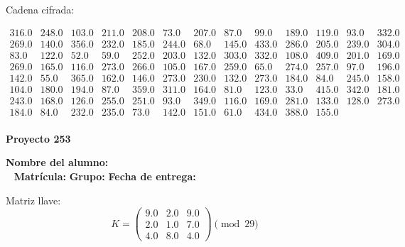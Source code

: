 \documentclass[12pt]{article}
\begin{document}
Cadena cifrada:
\begin{center}
$\begin{array}{lllllllllllll}
316.0 & 248.0 & 103.0 & 211.0 & 208.0 & 73.0 & 207.0 & 87.0 & 99.0 & 189.0 & 119.0 & 93.0 & 332.0\\
269.0 & 140.0 & 356.0 & 232.0 & 185.0 & 244.0 & 68.0 & 145.0 & 433.0 & 286.0 & 205.0 & 239.0 & 304.0\\
83.0 & 122.0 & 52.0 & 59.0 & 252.0 & 203.0 & 132.0 & 303.0 & 332.0 & 108.0 & 409.0 & 201.0 & 169.0\\
269.0 & 165.0 & 116.0 & 273.0 & 266.0 & 105.0 & 167.0 & 259.0 & 65.0 & 274.0 & 257.0 & 97.0 & 196.0\\
142.0 & 55.0 & 365.0 & 162.0 & 146.0 & 273.0 & 230.0 & 132.0 & 273.0 & 184.0 & 84.0 & 245.0 & 158.0\\
104.0 & 180.0 & 194.0 & 87.0 & 359.0 & 311.0 & 164.0 & 81.0 & 123.0 & 33.0 & 415.0 & 342.0 & 181.0\\
243.0 & 168.0 & 126.0 & 255.0 & 251.0 & 93.0 & 349.0 & 116.0 & 169.0 & 281.0 & 133.0 & 128.0 & 273.0\\
184.0 & 84.0 & 232.0 & 235.0 & 73.0 & 142.0 & 151.0 & 61.0 & 434.0 & 388.0 & 155.0\\
\end{array}$
\end{center}

\newpage


\textbf{Proyecto 253}

\textbf{Nombre del alumno:} \underline{\hspace{13cm}}\\\
\vspace{1cm}
\textbf{Matrícula:} \underline{\hspace{4cm}} \hspace{1cm}
\textbf{Grupo:} \underline{\hspace{2cm}}
\textbf{Fecha de entrega:} \underline{\hspace{2cm}}

\medskip

Matriz llave:
\[
K = \begin{pmatrix}
9.0 & 2.0 & 9.0\\
2.0 & 1.0 & 7.0\\
4.0 & 8.0 & 4.0
\end{pmatrix} \pmod{29}
\]
\end{document}
